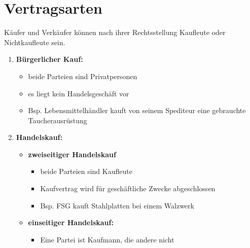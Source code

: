 \documentclass[a4paper,11pt]{scrartcl}	%
\author{Lars Friedrichsen}
\date{\today}
\begin{document}
\section{Vertragsarten}

Käufer und Verkäufer können nach ihrer Rechtsstellung Kaufleute oder Nichtkaufleute sein.

	\begin{enumerate}
		\item \textbf{Bürgerlicher Kauf:}
			\begin{itemize}
				\item beide Parteien sind Privatpersonen
				\item es liegt kein Handelsgeschäft vor
				\item Bsp. Lebensmittelhändler kauft von seinem Spediteur eine gebrauchte
					Taucherausrüstung
			\end{itemize}
		\item \textbf{Handelskauf:}
			\begin{itemize}
				\item \textbf{zweiseitiger Handelskauf}
					\begin{itemize}
						\item beide Parteien sind Kaufleute
						\item Kaufvertrag wird für geschäftliche Zwecke abgeschlossen
						\item Bsp. FSG kauft Stahlplatten bei einem Walzwerk
					\end{itemize}
				\item \textbf{einseitiger Handelskauf:}
					\begin{itemize}
						\item Eine Partei ist Kaufmann, die andere nicht
					\end{itemize}
			\end{itemize}
	\end{enumerate}
		
\section{}
\end{document}
